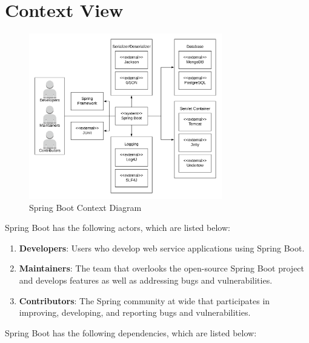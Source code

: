 \section{Context View}

\begin{figure}[ht]
    \centering
    \includegraphics[width=0.75\textwidth]{content/architectural-views-top-level/context-diagram-spring-boot.png}
    \caption{Spring Boot Context Diagram}
    \label{3-context-diagram}
\end{figure}

Spring Boot has the following actors, which are listed below:

\begin{enumerate}
  \item \textbf{Developers}: Users who develop web service applications using Spring Boot.
  \item \textbf{Maintainers}: The team that overlooks the open-source Spring Boot project and develops features as well as addressing bugs and vulnerabilities.
  \item \textbf{Contributors}: The Spring community at wide that participates in improving, developing, and reporting bugs and vulnerabilities.
\end{enumerate}

Spring Boot has the following dependencies, which are listed below:

